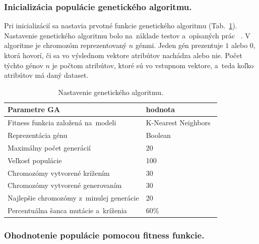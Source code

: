 \documentclass[runningheads]{llncs}
\begin{document}
\subsubsection{Inicializácia populácie genetického algoritmu.}

Pri inicializácií sa nastavia prvotné funkcie genetického algoritmu (Tab.~\ref{tab_nastavenie_gen_alg}). Nastavenie genetického algoritmu bolo na~základe testov a~opísaných prác ~\cite{ref_babatunde}.
V algoritme je chromozóm reprezentovaný \begin{math}n\end{math} génmi. Jeden gén prezentuje \begin{math}1\end{math} 
alebo \begin{math}0\end{math}, ktorá hovorí, či sa vo výslednom vektore atribútov nachádza alebo nie. 
Počet týchto génov \begin{math}n\end{math} je počtom atribútov, ktoré sú vo vstupnom vektore, a~teda 
koľko atribútov má daný dataset.

\begin{table}[]
\centering
\caption{Nastavenie genetického algoritmu.}\label{tab_nastavenie_gen_alg}
\begin{tabular}{|l|l|}
\hline
\textbf{Parametre GA}                    & \textbf{hodnota}  \\ \hline
Fitness funkcia založená na~modeli           & K-Nearest Neighbors~\cite{ref_babatunde} \\ \hline
Reprezentácia génu                       & Boolean  \\ \hline
Maximálny počet generácií                & 20       \\ \hline
Veľkosť populácie                        & 100      \\ \hline
Chromozómy vytvorené krížením            & 30       \\ \hline
Chromozómy vytvorené generovaním         & 30       \\ \hline
Najlepšie chromozómy z~minulej generácie & 20       \\ \hline
Percentuálna šanca mutácie a~kríženia    & 60\%     \\ \hline
\end{tabular}
\end{table}

\subsubsection{Ohodnotenie populácie pomocou fitness funkcie.}
\end{document}
